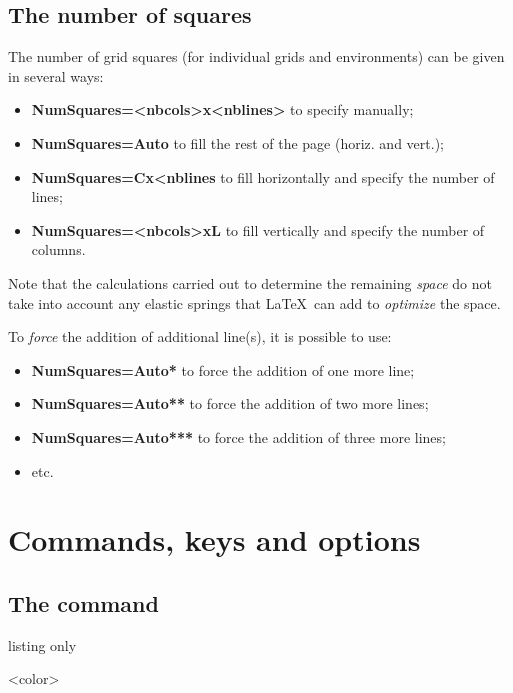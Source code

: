 \documentclass[a4paper]{article}
\newcommand\Cle[1]{{\bfseries\sffamily\textlangle #1\textrangle}}
\begin{document}
\subsection{The number of squares}

The number of grid squares (for individual grids and environments) can be given in several ways:

\begin{itemize}
	\item \Cle{NumSquares=<nbcols>x<nblines>} to specify manually;
	\item \Cle{NumSquares=Auto} to fill the rest of the page (horiz. and vert.);
	\item \Cle{NumSquares=Cx<nblines} to fill horizontally and specify the number of lines;
	\item \Cle{NumSquares=<nbcols>xL} to fill vertically and specify the number of columns.
\end{itemize}

Note that the calculations carried out to determine the remaining \textit{space} do not take into account any elastic springs that \LaTeX\ can add to \textit{optimize} the space.

\smallskip

To \textit{force} the addition of additional line(s), it is possible to use:

\begin{itemize}
	\item \Cle{NumSquares=Auto*} to force the addition of one more line;
	\item \Cle{NumSquares=Auto**} to force the addition of two more lines;
	\item \Cle{NumSquares=Auto***} to force the addition of three more lines;
	\item etc.
\end{itemize}

\pagebreak

\section{Commands, keys and options}

\subsection{The command}

\begin{PresentationCode}{listing only}

\DispGrid[keys]<color>
\end{PresentationCode}
\end{document}
